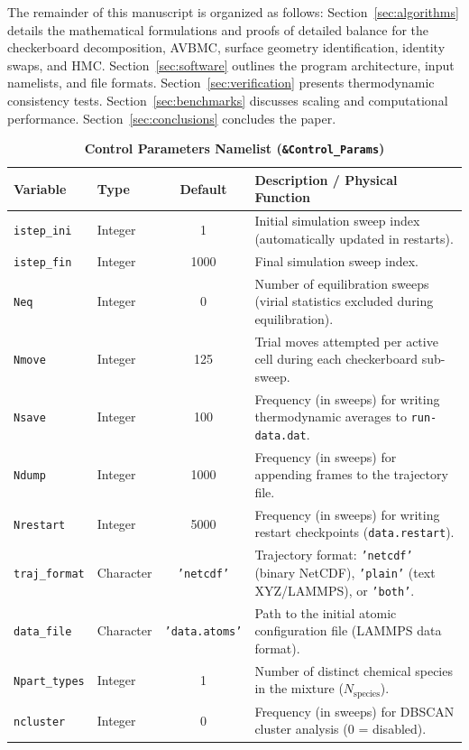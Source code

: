 \documentclass[final,5p,times,twocolumn]{elsarticle}
\begin{document}
The remainder of this manuscript is organized as follows:
Section~\ref{sec:algorithms} details the mathematical formulations and
proofs of detailed balance for the checkerboard decomposition, AVBMC,
surface geometry identification, identity swaps, and
HMC. Section~\ref{sec:software} outlines the program architecture,
input namelists, and file formats. Section~\ref{sec:verification}
presents thermodynamic
consistency tests. Section~\ref{sec:benchmarks} discusses scaling and
computational performance. Section~\ref{sec:conclusions} concludes the
paper. 
\begin{table}[tbp]
\centering
\small
\caption{\textbf{Control Parameters Namelist (\texttt{\&Control\_Params})}}
\label{tab:nml_control}
\begin{tabularx}{\textwidth}{l l c X}
\toprule
\textbf{Variable} & \textbf{Type} & \textbf{Default} & \textbf{Description / Physical Function} \\
\midrule
\texttt{istep\_ini} & Integer & 1 & Initial simulation sweep index (automatically updated in restarts). \\
\texttt{istep\_fin} & Integer & 1000 & Final simulation sweep index. \\
\texttt{Neq} & Integer & 0 & Number of equilibration sweeps (virial statistics excluded during equilibration). \\
\texttt{Nmove} & Integer & 125 & Trial moves attempted per active cell during each checkerboard sub-sweep. \\
\texttt{Nsave} & Integer & 100 & Frequency (in sweeps) for writing thermodynamic averages to \texttt{run-data.dat}. \\
\texttt{Ndump} & Integer & 1000 & Frequency (in sweeps) for appending frames to the trajectory file. \\
\texttt{Nrestart} & Integer & 5000 & Frequency (in sweeps) for writing restart checkpoints (\texttt{data.restart}). \\
\texttt{traj\_format} & Character & \texttt{'netcdf'} & Trajectory format: \texttt{'netcdf'} (binary NetCDF), \texttt{'plain'} (text XYZ/LAMMPS), or \texttt{'both'}. \\
\texttt{data\_file} & Character & \texttt{'data.atoms'} & Path to the initial atomic configuration file (LAMMPS data format). \\
\texttt{Npart\_types} & Integer & 1 & Number of distinct chemical species in the mixture ($N_{\text{species}}$). \\
\texttt{ncluster} & Integer & 0 & Frequency (in sweeps) for DBSCAN cluster analysis (0 = disabled). \\

\end{tabularx}
\end{table}
\end{document}

